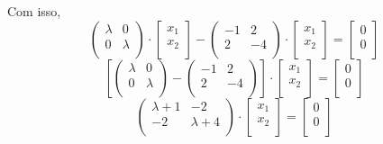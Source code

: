 Com isso,
$$\begin{pmatrix}\lambda & 0\\0 & \lambda\\ \end{pmatrix}\cdot\begin{bmatrix}x_1\\x_2\\ \end{bmatrix}-\begin{pmatrix}-1 & 2\\2 & -4\\ \end{pmatrix}\cdot\begin{bmatrix}x_1\\x_2\\ \end{bmatrix}=\begin{bmatrix}0\\0\\ \end{bmatrix}$$
$$\left[\begin{pmatrix}\lambda & 0\\0 & \lambda\\ \end{pmatrix}-\begin{pmatrix}-1 & 2\\2 & -4\\ \end{pmatrix}\right]\cdot\begin{bmatrix}x_1\\x_2\\ \end{bmatrix}=\begin{bmatrix}0\\0\\ \end{bmatrix}$$
\begin{equation} \label{eq:autoex1a}
\begin{pmatrix}
\lambda+1 & -2\\-2 & \lambda+4\\ \end{pmatrix}\cdot\begin{bmatrix}x_1\\x_2\\ \end{bmatrix}=\begin{bmatrix}0\\0\\ \end{bmatrix}
\end{equation}

